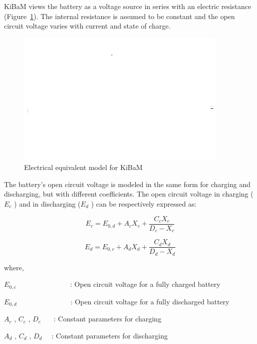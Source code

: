 KiBaM views the battery as a voltage source in series with an electric resistance (Figure~\ref{fig:electrical-equivalent-model-for-kibam}). The internal resistance is assumed to be constant and the open circuit voltage varies with current and state of charge.

\begin{figure}[hbtp] %
\centering
\includegraphics[width=0.9\textwidth, height=0.9\textheight, keepaspectratio=true]{media/image7528.svg.png}
\caption{Electrical equivalent model for KiBaM \protect \label{fig:electrical-equivalent-model-for-kibam}}
\end{figure}

The battery's open circuit voltage is modeled in the same form for charging and discharging, but with different coefficients. The open circuit voltage in charging (\({E_c}\) ) and in discharging (\({E_d}\) ) can be respectively expressed as:

\begin{equation}
{E_c} = {E_{0,d}} + {A_c}{X_c} + \frac{{{C_c}{X_c}}}{{{D_c} - {X_c}}}
\end{equation}

\begin{equation}
{E_d} = {E_{0,c}} + {A_d}{X_d} + \frac{{{C_d}{X_d}}}{{{D_d} - {X_d}}}
\end{equation}

where,

\({E_{0,c}}\) ~~~~~~~~~~~~~~ : Open circuit voltage for a fully charged battery

\({E_{0,d}}\) ~~~~~~~~~~~~~~ : Open circuit voltage for a fully discharged battery

\({A_c}\) , \({C_c}\) , \({D_c}\) ~~~: Constant parameters for charging

\({A_d}\) , \({C_d}\) , \({D_d}\) ~~: Constant parameters for discharging

